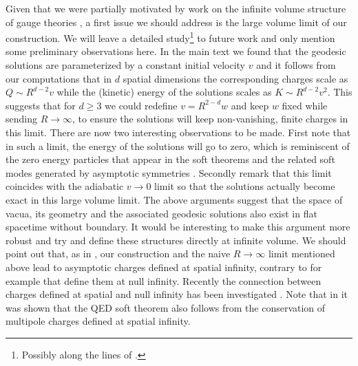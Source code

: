 \documentclass[11pt,a4paper]{article}
\begin{document}
    Given that we were partially motivated by work on the infinite volume structure of gauge theories \cite{Strominger:2017zoo}, a first issue we should address is the large volume limit of our construction. We will leave a detailed study\footnote{Possibly along the lines of \cite{Andrade:2015fna}.} to future work and only mention some preliminary observations here. In the main text we found that the geodesic solutions are parameterized by a constant initial velocity $v$ and it follows from our computations that in $d$ spatial dimensions the corresponding charges scale as $Q\sim R^{d-2} v$ while the (kinetic) energy of the solutions scales as $K\sim R^{d-2}v^2$. This suggests that for $d\geq 3$ we could redefine $v=R^{2-d}w$ and keep $w$ fixed while sending $R\rightarrow \infty$, to ensure the solutions will keep non-vanishing, finite charges in this limit. There are now two interesting observations to be made. First note that in such a limit, the energy of the solutions will go to zero, which is reminiscent of the zero energy particles that appear in the soft theorems and the related soft modes generated by asymptotic symmetries \cite{He:2014laa,Strominger:2017zoo}. Secondly remark that this limit coincides with the adiabatic $v\rightarrow 0$ limit so that the solutions actually become exact in this large volume limit. The above arguments suggest that the space of vacua, its geometry and the associated geodesic solutions also exist in flat spacetime without boundary. It would be interesting to make this argument more robust and try and define these structures directly at infinite volume. We should point out that, as in \cite{Seraj:2016jxi}, our construction and the naive $R\rightarrow \infty$ limit mentioned above lead to asymptotic charges defined at spatial infinity, contrary to for example \cite{Strominger:2013lka,Barnich:2013sxa}  that define them at null infinity. Recently the connection between charges defined at spatial and null infinity has been investigated \cite{Campiglia:2017mua,Compere:2017knf,Troessaert:2017jcm,Prohazka:2017equ}. Note that in \cite{Mirbabayi:2016xvc} it was shown that the QED soft theorem also follows from the conservation of multipole charges defined at spatial infinity.
    
\end{document}
